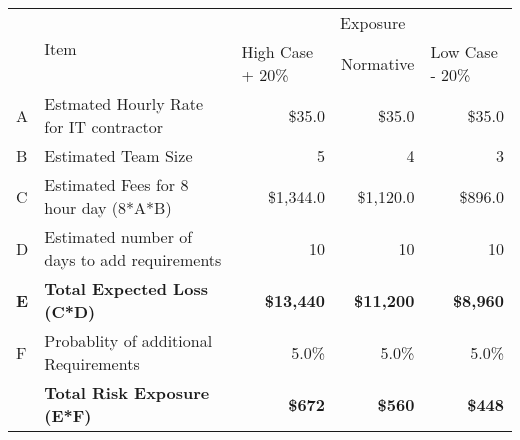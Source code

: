\begin{table}[h]
\begin{tabularx}{\textwidth}{@{}lXrrr@{}}
\toprule
\multirow{2}{*}{} & \multirow{2}{*}{Item}                        & \multicolumn{3}{c}{Exposure}                                                                               \\ \cmidrule(l){3-5} 
                  &                                              & \multicolumn{1}{l}{High Case + 20\%} & \multicolumn{1}{l}{Normative} & \multicolumn{1}{l}{Low Case - 20\%} \\ \midrule
A                 & Estmated Hourly Rate for IT contractor       & \$35.0                               & \$35.0                        & \$35.0                              \\
B                 & Estimated Team Size                          & 5                                    & 4                             & 3                                   \\
C                 & Estimated Fees for 8 hour day (8*A*B)        & \$1,344.0                            & \$1,120.0                     & \$896.0                             \\
D                 & Estimated number of days to add requirements & 10                                   & 10                            & 10                                  \\
\textbf{E}        & \textbf{Total Expected Loss (C*D)}           & \textbf{\$13,440}                    & \textbf{\$11,200}             & \textbf{\$8,960}                    \\
F                 & Probablity of additional Requirements        & 5.0\%                                & 5.0\%                         & 5.0\%                               \\
\textbf{}         & \textbf{Total Risk Exposure (E*F)}           & \textbf{\$672}                       & \textbf{\$560}                & \textbf{\$448}            \\ \bottomrule         
\end{tabularx}
\end{table}